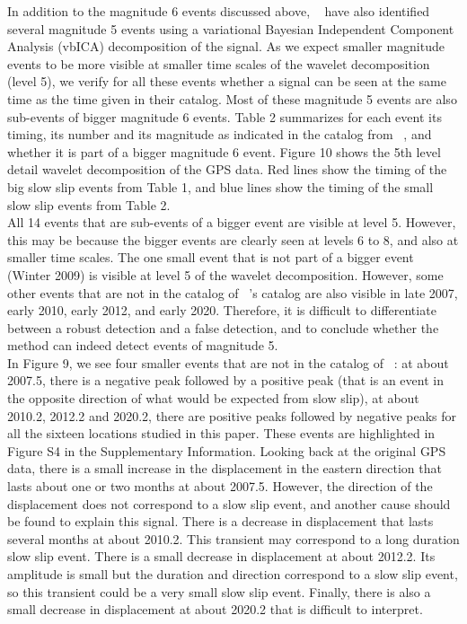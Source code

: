 \documentclass{article}
\begin{document}
In addition to the magnitude 6 events discussed above,  ~\citet{MIC_2019} have also identified several magnitude 5 events using a variational Bayesian Independent Component Analysis (vbICA) decomposition of the signal. As we expect smaller magnitude events to be more visible at smaller time scales of the wavelet decomposition (level 5), we verify for all these events whether a signal can be seen at the same time as the time given in their catalog. Most of these magnitude 5 events are also sub-events of bigger magnitude 6 events. Table 2 summarizes for each event its timing, its number and its magnitude as indicated in the catalog from ~\citet{MIC_2019}, and whether it is part of a bigger magnitude 6 event. Figure 10 shows the 5th level detail wavelet decomposition of the GPS data. Red lines show the timing of the big slow slip events from Table 1, and blue lines show the timing of the small slow slip events from Table 2. \\

All 14 events that are sub-events of a bigger event are visible at level 5. However, this may be because the bigger events are clearly seen at levels 6 to 8, and also at smaller time scales. The one small event that is not part of a bigger event (Winter 2009) is visible at level 5 of the wavelet decomposition. However, some other events that are not in the catalog of ~\citet{MIC_2019}'s catalog are also visible in late 2007, early 2010, early 2012, and early 2020. Therefore, it is difficult to differentiate between a robust detection and a false detection, and to conclude whether the method can indeed detect events of magnitude 5. \\

In Figure 9, we see four smaller events that are not in the catalog of ~\citet{MIC_2019}: at about 2007.5, there is a negative peak followed by a positive peak (that is an event in the opposite direction of what would be expected from slow slip), at about 2010.2, 2012.2 and 2020.2, there are positive peaks followed by negative peaks for all the sixteen locations studied in this paper. These events are highlighted in Figure S4 in the Supplementary Information. Looking back at the original GPS data, there is a small increase in the displacement in the eastern direction that lasts about one or two months at about 2007.5. However, the direction of the displacement does not correspond to a slow slip event, and another cause should be found to explain this signal. There is a decrease in displacement that lasts several months at about 2010.2. This transient may correspond to a long duration slow slip event. There is a small decrease in displacement at about 2012.2. Its amplitude is small but the duration and direction correspond to a slow slip event, so this transient could be a very small slow slip event. Finally, there is also a small decrease in displacement at about 2020.2 that is difficult to interpret. \\
\end{document}
